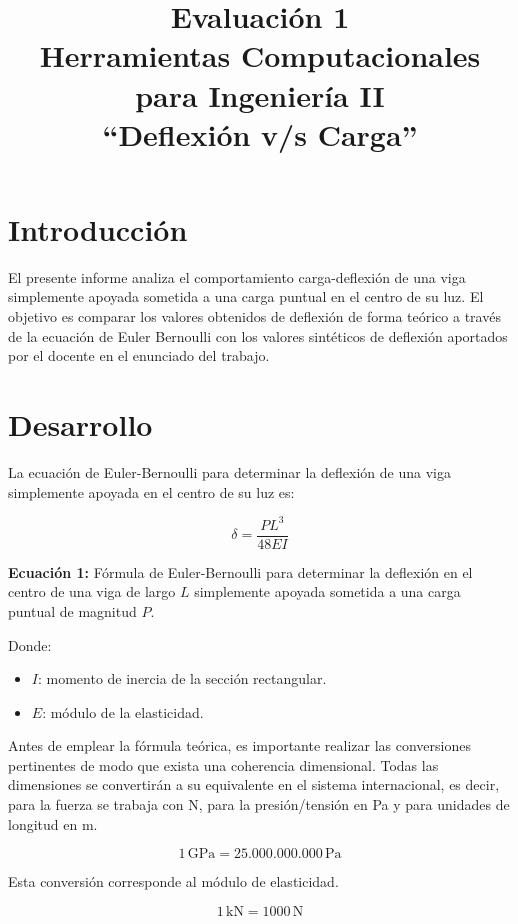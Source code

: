 \documentclass[12pt,a4paper]{article}
\title{\textbf{Evaluación 1}\\
Herramientas Computacionales para Ingeniería II\\
\large ``Deflexión v/s Carga''}
\author{}
\date{}
\begin{document}
\maketitle

\section{Introducción}

El presente informe analiza el comportamiento carga-deflexión de una viga
simplemente apoyada sometida a una carga puntual en el centro de su luz. El
objetivo es comparar los valores obtenidos de deflexión de forma teórico a
través de la ecuación de Euler Bernoulli con los valores sintéticos de
deflexión aportados por el docente en el enunciado del trabajo.

\section{Desarrollo}

La ecuación de Euler-Bernoulli para determinar la deflexión de una viga
simplemente apoyada en el centro de su luz es:

\begin{equation}
\delta = \frac{P L^3}{48EI}
\label{eq:euler}
\end{equation}

\noindent
\textbf{Ecuación 1:} Fórmula de Euler-Bernoulli para determinar la deflexión
en el centro de una viga de largo $L$ simplemente apoyada sometida a una
carga puntual de magnitud $P$.

Donde:
\begin{itemize}
    \item $I$: momento de inercia de la sección rectangular.
    \item $E$: módulo de la elasticidad.
\end{itemize}

Antes de emplear la fórmula teórica, es importante realizar las conversiones
pertinentes de modo que exista una coherencia dimensional. Todas las
dimensiones se convertirán a su equivalente en el sistema internacional, es
decir, para la fuerza se trabaja con N, para la presión/tensión en Pa y para
unidades de longitud en m.

\[
1\,\mathrm{GPa}=25.000.000.000\,\mathrm{Pa}
\]

Esta conversión corresponde al módulo de elasticidad.

\[
1\,\mathrm{kN}=1000\,\mathrm{N}
\]
\end{document}
